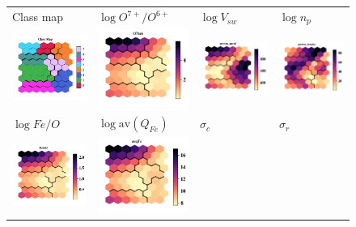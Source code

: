 \documentclass[utf8]{frontiersSCNS} %
\begin{document}
\begin{figure}[h!]\centering
	\begin{tabular}{CCCC}
		Class map & $\log O^{7+}/O^{6+}$ & $\log V_{sw}$ & $\log n_p$ \\
		\includegraphics[width=4cm]{Amaya/classmap} &
		\includegraphics[width=4cm]{Amaya/comp-map-log_O7to6} &
		\includegraphics[width=4cm]{Amaya/comp-map-log_proton_speed} &
		\includegraphics[width=4cm]{Amaya/comp-map-log_proton_density}\hfill
		\\
		$\log Fe/O$ & $\log \text{av}(Q_{Fe})$ & $\sigma_c$ & $\sigma_r$ \\
		\includegraphics[width=4cm]{Amaya/comp-map-log_FetoO} &
		\includegraphics[width=4cm]{Amaya/comp-map-log_avqFe} &

\end{tabular}
\end{figure}
\end{document}
